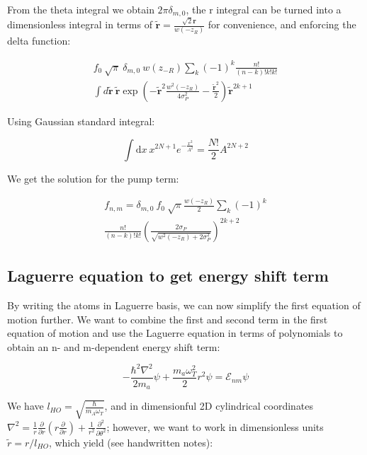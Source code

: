 \documentclass[a4paper,twocolumn,nobalancelastpage]{revtex4-1}
\newcommand{\vect}[1]{\mathbf{#1}}
\newcommand{\tvr}{\tilde{\vect{r}}}
\newcommand{\lho}{l_{HO}}
\begin{document}
From the theta integral we obtain $2 \pi \delta_{m,0}$, the r integral can be turned into a dimensionless integral in terms of $\tvr=\frac{\sqrt{2}\vect{r}}{w(-z_{R})}$ for convenience, and enforcing the delta function:

\begin{multline}
f_0 \ \sqrt{\pi} \ \delta_{m,0} \ w(z_{-R}) \sum_k (-1)^k \frac{n!}{(n-k)! k! k!} \\ \int d \tvr \ \tvr \exp\left( -\tvr^2 \frac{w^2(-z_{R})}{4 \sigma_P^2} -\frac{\tvr^2}{2} \right) \tvr^{2k+1}
\end{multline}

Using Gaussian standard integral:

\begin{equation}
\label{eq:gaussianint}
\int \mathrm{d}x \ x^{2N+1} e^{-\frac{x^2}{A^2}}=\frac{N!}{2} A^{2N+2}
\end{equation}

We get the solution for the pump term:

\begin{multline}
\label{eq:pumpterm}
f_{n,m}=\delta_{m,0} \ f_0  \ \sqrt{\pi}\frac{w(-z_{R})}{2} \sum_k (-1)^k  \\ \frac{n!}{(n-k)! k!} \left(\frac{2 \sigma_P}{\sqrt{w^2(-z_{R})+2\sigma_P^2}} \right)^{2k+2} 
\end{multline}

\subsection{Laguerre equation to get energy shift term}

By writing the atoms in Laguerre basis, we can now simplify the first equation of motion further.
We want to combine the first and second term in the first equation of motion and use the Laguerre equation in terms of polynomials to obtain an n- and m-dependent energy shift term:

\begin{equation}
\label{eq:laguerre1}
-\frac{\hbar^2 \nabla^2}{2m_a} \psi+ \frac{m_a \omega_T^2}{2}r^2 \psi= \mathcal{E}_{nm} \psi
\end{equation}

We have $\lho=\sqrt{\frac{\hbar}{m_A \omega_T}}$, and in dimensionful 2D cylindrical coordinates $\nabla^2=\frac{1}{r} \frac{\partial}{\partial r}\left( r \frac{\partial }{\partial r} \right)+\frac{1}{r^2}\frac{\partial ^2}{\partial \theta^2} $; however, we want to work in dimensionless units $\tilde{r}=r/l_{HO}$, which yield (see handwritten notes):
\end{document}
